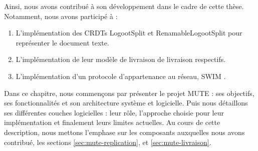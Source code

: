 Ainsi, nous avons contribué à son développement dans le cadre de cette thèse.
Notamment, nous avons participé à :
\begin{enumerate}
  \item L'implémentation des \acp{CRDT} LogootSplit \cite{2013-logootsplit} et RenamableLogootSplit \cite{2022-rls-tpds-nicolas} pour représenter le document texte.
  \item L'implémentation de leur modèle de livraison de livraison respectifs.
  \item L'implémentation d'un protocole d'appartenance au réseau, SWIM \cite{swim2002}.
\end{enumerate}

Dans ce chapitre, nous commençons par présenter le projet \ac{MUTE} : ses objectifs, ses fonctionnalités et son architecture système et logicielle.
Puis nous détaillons ses différentes couches logicielles : leur rôle, l'approche choisie pour leur implémentation et finalement leurs limites actuelles.
Au cours de cette description, nous mettons l'emphase sur les composants auxquelles nous avons contribué, \ie les sections \ref{sec:mute-replication}, et \ref{sec:mute-livraison}.

